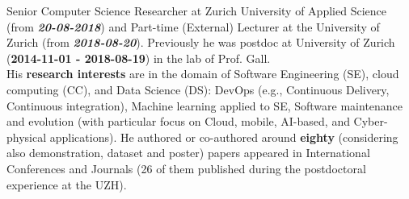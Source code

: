 \documentclass[11pt]{article}
\begin{document}
Senior Computer Science Researcher at Zurich University of Applied Science (from \textit{\textbf{20-08-2018}}) and Part-time (External) Lecturer at the University of Zurich (from \textit{\textbf{2018-08-20}}). Previously he was postdoc at University of Zurich (\textbf{2014-11-01 - 2018-08-19}) in the lab of Prof. Gall. 
\medskip\\
His  \textbf{research interests} are in the domain of Software Engineering (SE), cloud computing (CC), and Data Science (DS): DevOps (e.g., Continuous Delivery, Continuous integration), Machine learning applied to SE, Software maintenance and evolution (with particular focus on Cloud, mobile, AI-based, and Cyber-physical applications). 
He authored or co-authored around \textbf{eighty} (considering also demonstration, dataset 
  and poster) papers appeared in International Conferences and Journals (26 of them published during the postdoctoral experience at the UZH). 
\end{document}
